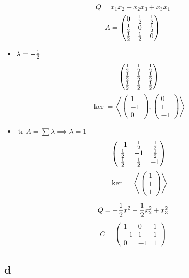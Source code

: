 $$ Q = x_1x_2 + x_2x_3 + x_3x_1 $$
$$ A =
\begin{pmatrix}
	0 & \frac{1}2 & \frac{1}2 \\
    \frac{1}2 & 0 & \frac{1}2 \\
    \frac{1}2 & \frac{1}2 & 0
\end{pmatrix} $$
\begin{itemize}
	\item $ \lambda = -\frac{1}2 $
    $$
    \begin{pmatrix}
    	\frac{1}2 & \frac{1}2 & \frac{1}2 \\
        \frac{1}2 & \frac{1}2 & \frac{1}2 \\
        \frac{1}2 & \frac{1}2 & \frac{1}2
    \end{pmatrix} $$
    $$ \ker = \left\langle
    \begin{pmatrix}
    	1 \\
        -1 \\
        0
    \end{pmatrix},
    \begin{pmatrix}
    	0 \\
        1 \\
        -1
    \end{pmatrix} \right\rangle $$
    \item $ \operatorname{tr} A = \sum \lambda \implies \lambda = 1 $
    $$
    \begin{pmatrix}
    	-1 & \frac{1}2 & \frac{1}2 \\
        \frac{1}2 & -1 & \frac{1}2 \\
        \frac{1}2 & \frac{1}2 & -1
    \end{pmatrix} $$
    $$ \ker = \left\langle
    \begin{pmatrix}
    	1 \\
        1 \\
        1
    \end{pmatrix} \right\rangle $$
\end{itemize}
$$ Q = -\frac{1}2 x_1^2 - \frac{1}2 x_2^2 + x_3^2 $$
$$ C =
\begin{pmatrix}
	1 & 0 & 1 \\
    -1 & 1 & 1 \\
    0 & -1 & 1
\end{pmatrix} $$

\subsection{d}


